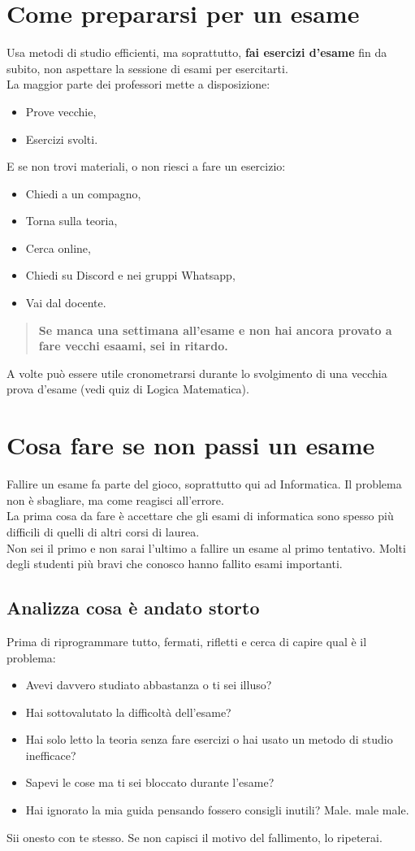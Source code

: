 \documentclass[18pt]{extarticle}
\begin{document}
\section{Come prepararsi per un esame}
Usa metodi di studio efficienti, ma soprattutto, \textbf{fai esercizi d'esame} fin da subito, non aspettare la sessione di esami per esercitarti.\\
La maggior parte dei professori mette a disposizione:
\begin{itemize}
\item Prove vecchie,
\item Esercizi svolti.
\end{itemize}
E se non trovi materiali, o non riesci a fare un esercizio:
\begin{itemize}
\item Chiedi a un compagno,
\item Torna sulla teoria,
\item Cerca online,
\item Chiedi su Discord e nei gruppi Whatsapp,
\item Vai dal docente.
\end{itemize}
\begin{quote}
\textbf{Se manca una settimana all'esame e non hai ancora provato a fare vecchi esaami, sei in ritardo.}
\end{quote}
A volte può essere utile cronometrarsi durante lo svolgimento di una vecchia prova d'esame (vedi quiz di Logica Matematica).

\clearpage
\section{Cosa fare se non passi un esame}
Fallire un esame fa parte del gioco, soprattutto qui ad Informatica. Il problema non è sbagliare, ma come reagisci all'errore.\\
La prima cosa da fare è accettare che gli esami di informatica sono spesso più difficili di quelli di altri corsi di laurea.\\
Non sei il primo e non sarai l'ultimo a fallire un esame al primo tentativo.  
Molti degli studenti più bravi che conosco hanno fallito esami importanti.


\subsection{Analizza cosa è andato storto}
Prima di riprogrammare tutto, fermati, rifletti e cerca di capire qual è il problema:
\begin{itemize}
\item Avevi davvero studiato abbastanza o ti sei illuso?
\item Hai sottovalutato la difficoltà dell'esame?
\item Hai solo letto la teoria senza fare esercizi o hai usato un metodo di studio inefficace?
\item Sapevi le cose ma ti sei bloccato durante l'esame?
\item Hai ignorato la mia guida pensando fossero consigli inutili? Male. male male.
\end{itemize}
Sii onesto con te stesso. Se non capisci il motivo del fallimento, lo ripeterai.
\end{document}
